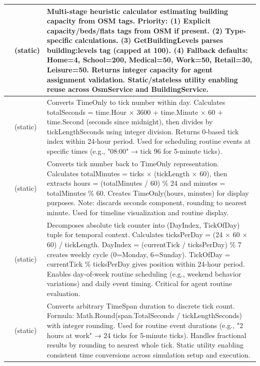 \begin{longtable}{|L{4cm}|L{4cm}|L{6cm}|}
 & 
 (static) & 
Multi-stage heuristic calculator estimating building capacity from OSM tags. Priority: (1) Explicit capacity/beds/flats tags from OSM if present. (2) Type-specific calculations. (3) GetBuildingLevels parses building:levels tag (capped at 100). (4) Fallback defaults: Home=4, School=200, Medical=50, Work=50, Retail=30, Leisure=50. Returns integer capacity for agent assignment validation. Static/stateless utility enabling reuse across OsmService and BuildingService. \\
\hline
{} & 
 (static) & 
Converts TimeOnly to tick number within day. Calculates totalSeconds = time.Hour × 3600 + time.Minute × 60 + time.Second (seconds since midnight), then divides by tickLengthSeconds using integer division. Returns 0-based tick index within 24-hour period. Used for scheduling routine events at specific times (e.g., "08:00" → tick 96 for 5-minute ticks). \\
&  (static) & 
Converts tick number back to TimeOnly representation. Calculates totalMinutes = ticks × (tickLength × 60), then extracts hours = (totalMinutes / 60) \% 24 and minutes = totalMinutes \% 60. Creates TimeOnly(hours, minutes) for display purposes. Note: discards seconds component, rounding to nearest minute. Used for timeline visualization and routine display. \\
&  (static) & 
Decomposes absolute tick counter into (DayIndex, TickOfDay) tuple for temporal context. Calculates ticksPerDay = (24 × 60 × 60) / tickLength. DayIndex = (currentTick / ticksPerDay) \% 7 creates weekly cycle (0=Monday, 6=Sunday). TickOfDay = currentTick \% ticksPerDay gives position within 24-hour period. Enables day-of-week routine scheduling (e.g., weekend behavior variations) and daily event timing. Critical for agent routine evaluation. \\
&  (static) & 
Converts arbitrary TimeSpan duration to discrete tick count. Formula: Math.Round(span.TotalSeconds / tickLengthSeconds) with integer rounding. Used for routine event durations (e.g., "2 hours at work" → 24 ticks for 5-minute ticks). Handles fractional results by rounding to nearest whole tick. Static utility enabling consistent time conversions across simulation setup and execution. \\
\hline

\end{longtable}

